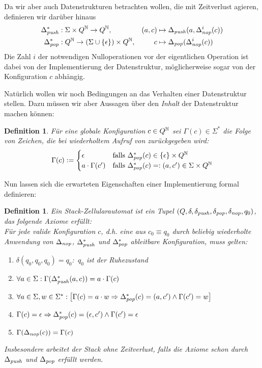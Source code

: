 \documentclass{article}
\newcounter{ctr}
\newtheorem{definition}[ctr]{Definition}
\begin{document}
Da wir aber auch Datenstrukturen betrachten wollen, die mit Zeitverlust agieren, definieren wir darüber hinaus
\begin{align*}
    \Delta^*_{\mathit{push}} &: \Sigma \times Q^{\mathbb{N}} \rightarrow Q^{\mathbb{N}},& (a,c) &\mapsto \Delta_{\mathit{push}}(a,\Delta^i_{\mathit{nop}}(c)) \\
    \Delta^*_{\mathit{pop}} &: Q^{\mathbb{N}} \rightarrow (\Sigma \cup \{\epsilon\}) \times Q^{\mathbb{N}},& c &\mapsto \Delta_{\mathit{pop}}(\Delta^i_{\mathit{nop}}(c))
\end{align*}
Die Zahl $i$ der notwendigen Nulloperationen vor der eigentlichen Operation ist dabei von der Implementierung der Datenstruktur, möglicherweise sogar von der Konfiguration $c$ abhängig.

Natürlich wollen wir noch Bedingungen an das Verhalten einer Datenstruktur stellen. Dazu müssen wir aber Aussagen über den \emph{Inhalt} der Datenstruktur machen können:
\begin{definition}
    Für eine globale Konfiguration $c \in Q^{\mathbb{N}}$ sei $\Gamma(c) \in \Sigma^*$ die Folge von Zeichen, die bei wiederholtem Aufruf von \pop zurückgegeben wird:
    \[ \Gamma(c) :=
        \begin{cases}
            \epsilon &\text{falls } \Delta^*_{\mathit{pop}}(c) \in \{\epsilon\} \times Q^{\mathbb{N}} \\
            a \cdot \Gamma(c') &\text{falls }\Delta^*_{\mathit{pop}}(c)=:(a,c') \in \Sigma \times Q^{\mathbb{N}}
    \end{cases} \]
\end{definition}

Nun lassen sich die erwarteten Eigenschaften einer Implementierung formal definieren:
\begin{definition}
    Ein \emph{Stack}-Zellularautomat ist ein Tupel $(Q, \delta, \delta_{\mathit{push}}, \delta_{\mathit{pop}}, \delta_{\mathit{nop}}, q_0)$, das folgende Axiome erfüllt: \\
    Für jede \emph{valide} Konfiguration $c$, d.h. eine aus $c_0 \equiv q_0$ durch beliebig wiederholte Anwendung von $\Delta_\mathit{nop}$, $\Delta^*_\mathit{push}$ und $\Delta^*_\mathit{pop}$ ableitbare Konfiguration, muss gelten:
    \begin{enumerate}
        \item $\delta(q_0, q_0, q_0) = q_0$: $\,q_0$ ist der Ruhezustand
        \item $\forall a \in \Sigma: \Gamma(\Delta^*_{\mathit{push}}(a,c)) = a \cdot \Gamma(c)$
        \item $\forall a \in \Sigma, w \in \Sigma^*: \left[ \Gamma(c) = a \cdot w \Rightarrow \Delta^*_{\mathit{pop}}(c) = (a,c') \wedge \Gamma(c') = w \right]$
        \item $\Gamma(c) = \epsilon \Rightarrow \Delta^*_{\mathit{pop}}(c) = (\epsilon,c') \wedge \Gamma(c') = \epsilon$
        \item $\Gamma(\Delta_{\mathit{nop}}(c)) = \Gamma(c)$
    \end{enumerate}
    Insbesondere arbeitet der Stack \emph{ohne Zeitverlust}, falls die Axiome schon durch $\Delta_{\mathit{push}}$ und $\Delta_{\mathit{pop}}$ erfüllt werden.
\end{definition}
\end{document}
